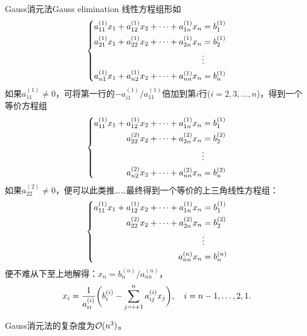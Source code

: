 \begin{theorem}
    {Gauss消元法}{Gauss elimination}
    线性方程组形如
    \begin{equation*}
        \left\{\begin{aligned}
            a_{11}^{(1)}x_1 + a_{12}^{(1)}x_2 + \cdots + a_{1n}^{(1)}x_n &= b_1^{(1)}\\
            a_{21}^{(1)}x_1 + a_{22}^{(1)}x_2 + \cdots + a_{2n}^{(1)}x_n &= b_2^{(1)}\\
            &\vdots\\
            a_{n1}^{(1)}x_1 + a_{n2}^{(1)}x_2 + \cdots + a_{nn}^{(1)}x_n &= b_n^{(1)}
        \end{aligned}\right.
    \end{equation*}
    如果$a_{11}^{(1)} \neq 0$，可将第一行的$-a_{i1}^{(1)}/a_{11}^{(1)}$倍加到第$i$行($i = 2,3,\ldots,n$)，得到一个等价方程组
    \begin{equation*}
        \left\{\begin{aligned}
            a_{11}^{(1)}x_1 + a_{12}^{(1)}x_2 + \cdots + a_{1n}^{(1)}x_n &= b_1^{(1)}\\
            a_{22}^{(2)}x_2 + \cdots + a_{2n}^{(2)}x_n &= b_2^{(2)}\\
            &\vdots\\
            a_{n2}^{(2)}x_2 + \cdots + a_{nn}^{(2)}x_n &= b_n^{(2)}
        \end{aligned}\right.
    \end{equation*}
    如果$a_{22}^{(2)} \neq 0$，便可以此类推……最终得到一个等价的上三角线性方程组：
    \begin{equation*}
        \left\{\begin{aligned}
            a_{11}^{(1)}x_1 + a_{12}^{(1)}x_2 + \cdots + a_{1n}^{(1)}x_n &= b_1^{(1)}\\
            a_{22}^{(2)}x_2 + \cdots + a_{2n}^{(2)}x_n &= b_2^{(2)}\\
            &\vdots\\
            a_{nn}^{(n)}x_n &= b_n^{(n)}
        \end{aligned}\right.
    \end{equation*}
    便不难从下至上地解得：$x_n = b_n^{(n)}/a_{nn}^{(n)}$，
    \begin{equation}
        x_i = \frac{1}{a_{ii}^{(i)}}\biggl(b_{i}^{(i)} - \sum_{j=i+1}^na_{ij}^{(i)}x_j\biggr),\quad i = n - 1,\ldots,2,1.
    \end{equation}
\end{theorem}

\begin{corollary}
    Gauss消元法的复杂度为$\mathcal{O}(n^3)$。
\end{corollary}

